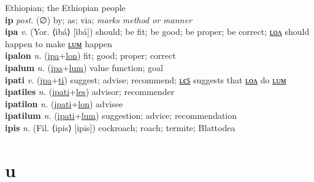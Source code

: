 Ethiopian; the Ethiopian people \label{'ityopyawon} \\
\textbf{ip} \textit{post.} (∅)
by; as; via; \textit{marks method or manner} \label{ip} \\
\textbf{ipa} \textit{v.} (Yor. ⟨ìbá⟩ [ìbá])
should; be fit; be good; be proper; be correct; \hyperref[ipalon]{ʟᴏᴧ} should happen to make \hyperref[ipalum]{ʟᴜᴍ} happen \label{ipa} \\
\textbf{ipalon} \textit{n.} (\hyperref[ipa]{ipa}+\hyperref[lon]{lon})
fit; good; proper; correct \label{ipalon} \\
\textbf{ipalum} \textit{n.} (\hyperref[ipa]{ipa}+\hyperref[lum]{lum})
value function; goal \label{ipalum} \\
\textbf{ipati} \textit{v.} (\hyperref[ipa]{ipa}+\hyperref[ti]{ti})
suggest; advise; recommend; \hyperref[ipatiles]{ʟєꜱ} suggests that \hyperref[ipatilon]{ʟᴏᴧ} do \hyperref[ipatilum]{ʟᴜᴍ} \label{ipati} \\
\textbf{ipatiles} \textit{n.} (\hyperref[ipati]{ipati}+\hyperref[les]{les})
advisor; recommender \label{ipatiles} \\
\textbf{ipatilon} \textit{n.} (\hyperref[ipati]{ipati}+\hyperref[lon]{lon})
advisee \label{ipatilon} \\
\textbf{ipatilum} \textit{n.} (\hyperref[ipati]{ipati}+\hyperref[lum]{lum})
suggestion; advice; recommendation \label{ipatilum} \\
\textbf{ipis} \textit{n.} (Fil. ⟨ipis⟩ [ipis])
cockroach; roach; termite; Blattodea \label{ipis} 

\section{u}

